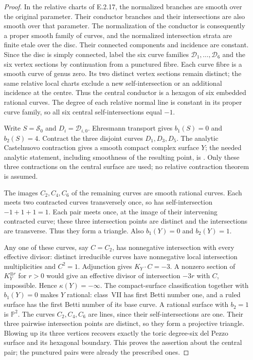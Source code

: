 \begin{proof}
In the relative charts of E.2.17, the normalized
branches are smooth over the original parameter.
Their conductor branches and their intersections
are also smooth over that parameter.  The
normalization of the conductor is consequently
a proper smooth family of curves, and the
normalized intersection strata are finite
etale over the disc.  Their connected components
and incidence are constant.  Since the disc
is simply connected, label the six curve
families $\mathcal D_1,\ldots,\mathcal D_6$
and the six vertex sections by continuation
from a punctured fibre.  Each curve fibre
is a smooth curve of genus zero.  Its two
distinct vertex sections remain distinct;
the same relative local charts exclude a
new self-intersection or an additional
incidence at the centre.  Thus the central
conductor is a hexagon of six embedded
rational curves.  The degree of each
relative normal line is constant in its
proper curve family, so all six central
self-intersections equal $-1$.

Write $S=\mathcal S_0$ and $D_i=\mathcal D_{i,0}$.
Ehresmann transport gives $b_1(S)=0$ and
$b_2(S)=4$.  Contract the three disjoint
curves $D_1,D_3,D_5$.  The analytic
Castelnuovo contraction gives a smooth
compact complex surface $Y$; the needed
analytic statement, including smoothness
of the resulting point, is
\citet[\S4, no.~8(a), pp.~364--365]{Grauert1962E}.
Only these three contractions on the
central surface are used; no relative
contraction theorem is assumed.

The images $C_2,C_4,C_6$ of the remaining
curves are smooth rational curves.  Each
meets two contracted curves transversely
once, so has self-intersection
$-1+1+1=1$.  Each pair meets once, at
the image of their intervening contracted
curve; these three intersection points
are distinct and the intersections are
transverse.  Thus they form a triangle.
Also $b_1(Y)=0$ and $b_2(Y)=1$.

Any one of these curves, say $C=C_2$,
has nonnegative intersection with every
effective divisor: distinct irreducible
curves have nonnegative local intersection
multiplicities and $C^2=1$.  Adjunction
gives $K_Y\cdot C=-3$.  A nonzero section
of $K_Y^{\otimes r}$ for $r>0$ would
give an effective divisor of intersection
$-3r$ with $C$, impossible.  Hence
$\kappa(Y)=-\infty$.  The compact-surface
classification
\cite[Chapter~VI, Theorem~1.1 and Table~10]{BHPV2004E}
together with $b_1(Y)=0$ makes $Y$ rational:
class~VII has first Betti number one,
and a ruled surface has the first Betti
number of its base curve.  A rational
surface with $b_2=1$ is $\mathbb P^2$.
The curves $C_2,C_4,C_6$ are lines,
since their self-intersections are one.
Their three pairwise intersection points
are distinct, so they form a projective
triangle.  Blowing up its three vertices
recovers exactly the toric degree-six
del Pezzo surface and its hexagonal
boundary.  This proves the assertion
about the central pair; the punctured
pairs were already the prescribed ones.


\end{proof}
